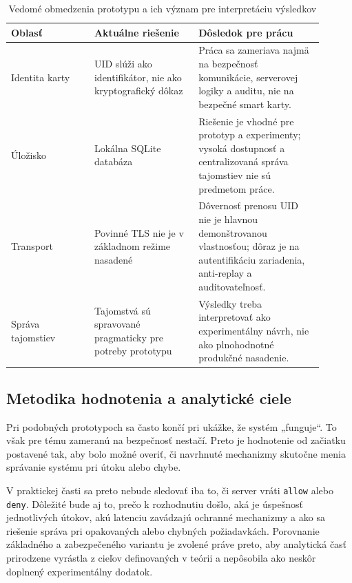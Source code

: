 \documentclass[journal,a4paper,onecolumn]{IEEEtran}
\begin{document}
\begin{table}[!ht]
\centering
\caption{Vedomé obmedzenia prototypu a ich význam pre interpretáciu výsledkov}
\label{tab:prototype_limits}
\small
\begin{tabular}{p{0.24\linewidth} p{0.30\linewidth} p{0.36\linewidth}}
\toprule
\textbf{Oblasť} & \textbf{Aktuálne riešenie} & \textbf{Dôsledok pre prácu} \\
\midrule
Identita karty & UID slúži ako identifikátor, nie ako kryptografický dôkaz & Práca sa zameriava najmä na bezpečnosť komunikácie, serverovej logiky a auditu, nie na bezpečné smart karty. \\
Úložisko & Lokálna SQLite databáza & Riešenie je vhodné pre prototyp a experimenty; vysoká dostupnosť a centralizovaná správa tajomstiev nie sú predmetom práce. \\
Transport & Povinné TLS nie je v základnom režime nasadené & Dôvernosť prenosu UID nie je hlavnou demonštrovanou vlastnosťou; dôraz je na autentifikáciu zariadenia, anti-replay a auditovateľnosť. \\
Správa tajomstiev & Tajomstvá sú spravované pragmaticky pre potreby prototypu & Výsledky treba interpretovať ako experimentálny návrh, nie ako plnohodnotné produkčné nasadenie. \\
\bottomrule
\end{tabular}
\normalsize
\end{table}

\subsection{Metodika hodnotenia a analytické ciele}

Pri podobných prototypoch sa často končí pri ukážke, že systém „funguje“. To však pre tému zameranú na bezpečnosť nestačí. Preto je hodnotenie od začiatku postavené tak, aby bolo možné overiť, či navrhnuté mechanizmy skutočne menia správanie systému pri útoku alebo chybe.

V praktickej časti sa preto nebude sledovať iba to, či server vráti \texttt{allow} alebo \texttt{deny}. Dôležité bude aj to, prečo k rozhodnutiu došlo, aká je úspešnosť jednotlivých útokov, akú latenciu zavádzajú ochranné mechanizmy a ako sa riešenie správa pri opakovaných alebo chybných požiadavkách. Porovnanie základného a zabezpečeného variantu je zvolené práve preto, aby analytická časť prirodzene vyrástla z cieľov definovaných v teórii a nepôsobila ako neskôr doplnený experimentálny dodatok.
\end{document}

